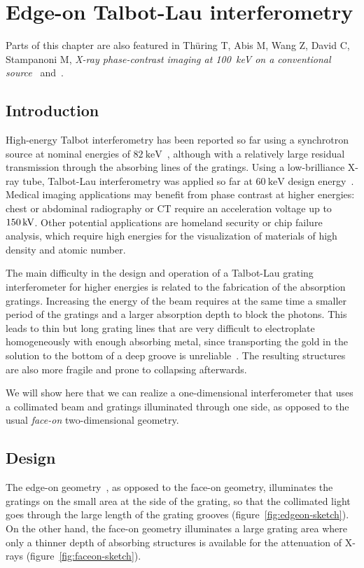 \chapter{Edge-on Talbot-Lau interferometry}\label{ch:edgeon} %
Parts of this chapter are also featured in Th\"uring T, Abis M, Wang Z,
David C, Stampanoni M, \emph{X-ray phase-contrast imaging at
    \SI{100}{\kilo\eV} on a conventional source}~\parencite{Thuering2014b}
    and~\parencite{20.500.11850/74467}.

\section{Introduction}
High-energy Talbot interferometry has been reported so far using a
synchrotron source at nominal energies of
$\SI{82}{\kilo\electronvolt}$~\parencite{Willner2013}, although with a relatively
large residual transmission through the absorbing lines of the gratings.
Using a low-brilliance X-ray tube, Talbot-Lau interferometry was applied so
far at $\SI{60}{\kilo\electronvolt}$ design energy~\parencite{Donath2009a}.
Medical imaging applications may benefit from phase contrast at higher
energies: chest or abdominal radiography or \ac{CT} require an acceleration
voltage up to $\SI{150}{\kilo\volt}$. Other potential
applications are homeland security or chip failure analysis, which require
high energies for the visualization of materials of high density and atomic
number.

The main difficulty in the design and operation of a Talbot-Lau grating
interferometer for higher energies is related to the fabrication of the
absorption gratings. Increasing the energy of the beam requires at the same
time a smaller period of the gratings and a larger absorption depth to block
the photons. This leads to thin but long grating lines that are very
difficult to electroplate homogeneously with enough absorbing metal, since
transporting the gold in the solution to the bottom of a deep groove is
unreliable~\parencite{KAGIAS2018}.
The resulting structures are also more fragile and prone to collapsing
afterwards.

We will show here that we can realize a one-dimensional interferometer that
uses a collimated beam and gratings illuminated through one side, as opposed
to the usual \emph{face-on} two-dimensional geometry.

\section{Design}
The edge-on geometry~\parencite{david2014method}, as opposed to the face-on geometry, illuminates the
gratings on the small area at the side of the grating, so that the
collimated light
goes through the large length of the grating grooves
(figure~\ref{fig:edgeon-sketch}). On the other hand, the
face-on geometry illuminates a large grating area where only a thinner
depth of absorbing structures is available for the attenuation of X-rays
(figure~\ref{fig:faceon-sketch}).

